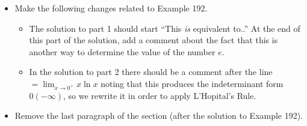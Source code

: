 \documentclass[12pt]{report}
\begin{document}
\begin{itemize}
\item Make the following changes related to Example 192.
\begin{itemize}
\item The solution to part 1 should start ``This \emph{is} equivalent to..'' At the end of this part of the solution, add a comment about the fact that this is another way to determine the value of the number $e$.

\item In the solution to part 2 there should be a comment after the line $=\lim_{x\to0^+} x\ln x$ noting that this produces the indeterminant form $0(-\infty)$, so we rewrite it in order to apply L'Hopital's Rule.
\end{itemize}

\item Remove the last paragraph of the section (after the solution to Example 192).


\end{itemize}
\end{document}
